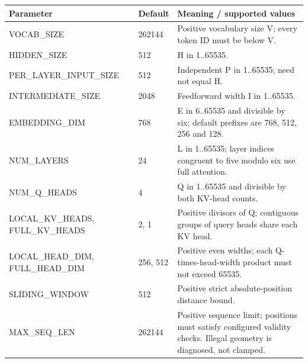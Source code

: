 \documentclass[11pt,a4paper]{article}
\begin{document}
{\small\renewcommand{\arraystretch}{1.18}\begin{longtable}{@{}L{0.22\textwidth}|L{0.21\textwidth}|L{0.49\textwidth}@{}}\toprule

\textbf{Parameter} & \textbf{Default} & \textbf{Meaning /\allowbreak{} supported values}\\\midrule\endhead

VOCAB\_\allowbreak{}SIZE & 262144 & Positive vocabulary size V; every token ID must be below V.\\[2pt]\hline

HIDDEN\_\allowbreak{}SIZE & 512 & H in 1..65535.\\[2pt]\hline

PER\_\allowbreak{}LAYER\_\allowbreak{}INPUT\_\allowbreak{}SIZE & 512 & Independent P in 1..65535; need not equal H.\\[2pt]\hline

INTERMEDIATE\_\allowbreak{}SIZE & 2048 & Feedforward width I in 1..65535.\\[2pt]\hline

EMBEDDING\_\allowbreak{}DIM & 768 & E in 6..65535 and divisible by six; default prefixes are 768,\allowbreak{} 512,\allowbreak{} 256 and 128.\\[2pt]\hline

NUM\_\allowbreak{}LAYERS & 24 & L in 1..65535; layer indices congruent to five modulo six use full attention.\\[2pt]\hline

NUM\_\allowbreak{}Q\_\allowbreak{}HEADS & 4 & Q in 1..65535 and divisible by both KV-head counts.\\[2pt]\hline

LOCAL\_\allowbreak{}KV\_\allowbreak{}HEADS,\allowbreak{} FULL\_\allowbreak{}KV\_\allowbreak{}HEADS & 2,\allowbreak{} 1 & Positive divisors of Q; contiguous groups of query heads share each KV head.\\[2pt]\hline

LOCAL\_\allowbreak{}HEAD\_\allowbreak{}DIM,\allowbreak{} FULL\_\allowbreak{}HEAD\_\allowbreak{}DIM & 256,\allowbreak{} 512 & Positive even widths; each Q-times-head-width product must not exceed 65535.\\[2pt]\hline

SLIDING\_\allowbreak{}WINDOW & 512 & Positive strict absolute-position distance bound.\\[2pt]\hline

MAX\_\allowbreak{}SEQ\_\allowbreak{}LEN & 262144 & Positive sequence limit; positions must satisfy configured validity checks. Illegal geometry is diagnosed,\allowbreak{} not clamped.\\[2pt]\hline

\bottomrule\end{longtable}}
\end{document}
